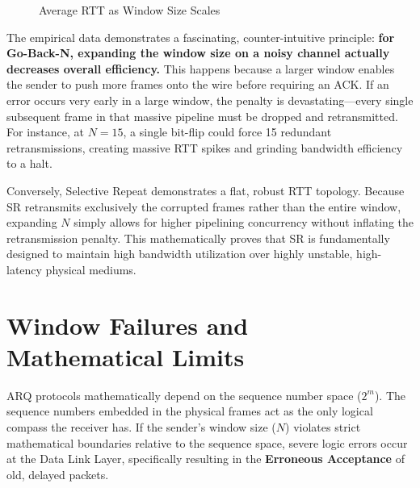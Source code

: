 \documentclass[12pt]{article}
\begin{document}
\begin{figure}[H]
    \centering
    \caption{Average RTT as Window Size Scales}
\end{figure}

The empirical data demonstrates a fascinating, counter-intuitive principle: \textbf{for Go-Back-N, expanding the window size on a noisy channel actually decreases overall efficiency.} This happens because a larger window enables the sender to push more frames onto the wire before requiring an ACK. If an error occurs very early in a large window, the penalty is devastating—every single subsequent frame in that massive pipeline must be dropped and retransmitted. For instance, at $N=15$, a single bit-flip could force 15 redundant retransmissions, creating massive RTT spikes and grinding bandwidth efficiency to a halt.

Conversely, Selective Repeat demonstrates a flat, robust RTT topology. Because SR retransmits exclusively the corrupted frames rather than the entire window, expanding $N$ simply allows for higher pipelining concurrency without inflating the retransmission penalty. This mathematically proves that SR is fundamentally designed to maintain high bandwidth utilization over highly unstable, high-latency physical mediums.

\section{Window Failures and Mathematical Limits}
ARQ protocols mathematically depend on the sequence number space ($2^m$). The sequence numbers embedded in the physical frames act as the only logical compass the receiver has. If the sender's window size ($N$) violates strict mathematical boundaries relative to the sequence space, severe logic errors occur at the Data Link Layer, specifically resulting in the \textbf{Erroneous Acceptance} of old, delayed packets.
\end{document}
